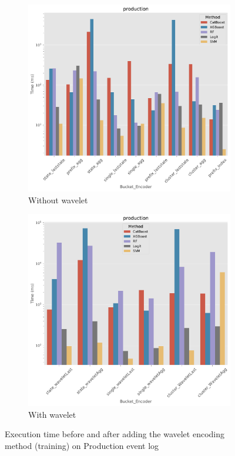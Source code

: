 \begin{figure}[!htbp] %
	
	\begin{subfigure}{0.48\textwidth}
		\includegraphics[width=\linewidth]{images/wavelet/time/cat_production.pdf}
		\caption{Without wavelet} \label{fig:tw1}
	\end{subfigure}\hspace*{\fill}
	\begin{subfigure}{0.48\textwidth}
		\includegraphics[width=\linewidth]{images/wavelet/time/wavelet_production.pdf}
		\caption{With wavelet} \label{fig:tw2}
	\end{subfigure}\hspace*{\fill}
	\caption{Execution time before and after adding the wavelet encoding method (training) on Production event log}
\label{fig:wT1}
\end{figure}

